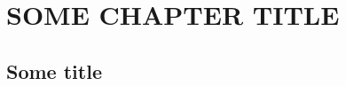 %
%
%
%

\newpage
\section{\MakeUppercase{Some Chapter Title}}\label{sec:ch3}

\subsection{Some title}
